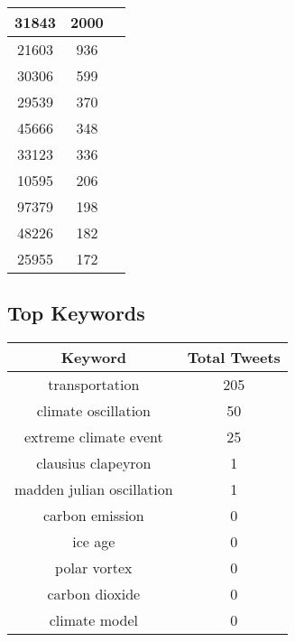 \documentclass{article}\usepackage[T1]{fontenc}
\begin{document}
\begin{tabular}{|c|c|c|}
 \hline
31843 & 2000\\ 
 \hline
21603 & 936\\ 
 \hline
30306 & 599\\ 
 \hline
29539 & 370\\ 
 \hline
45666 & 348\\ 
 \hline
33123 & 336\\ 
 \hline
10595 & 206\\ 
 \hline
97379 & 198\\ 
 \hline
48226 & 182\\ 
 \hline
25955 & 172\\ 
 \hline
\end{tabular}\subsection*{Top Keywords}\begin{tabular}{|c|c|}         \hline         Keyword & Total Tweets \\ 
 \hline
transportation & 205\\ 
 \hline
climate oscillation & 50\\ 
 \hline
extreme climate event & 25\\ 
 \hline
clausius clapeyron & 1\\ 
 \hline
madden julian oscillation & 1\\ 
 \hline
carbon emission & 0\\ 
 \hline
ice age & 0\\ 
 \hline
polar vortex & 0\\ 
 \hline
carbon dioxide & 0\\ 
 \hline
climate model & 0\\ 
 \hline
\end{tabular}
\end{document}
